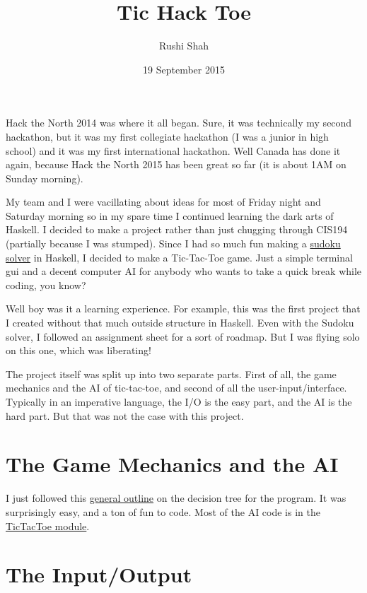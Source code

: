 \documentclass[12pt]{article}
\title{Tic Hack Toe}
\author{Rushi Shah}
\date{19 September 2015}
\begin{document}
  \maketitle

  Hack the North 2014 was where it all began. Sure, it was technically my
  second hackathon, but it was my first collegiate hackathon (I was a
  junior in high school) and it was my first international hackathon. Well
  Canada has done it again, because Hack the North 2015 has been great so
  far (it is about 1AM on Sunday morning).

  My team and I were vacillating about ideas for most of Friday night and
  Saturday morning so in my spare time I continued learning the dark arts
  of Haskell. I decided to make a project rather than just chugging
  through CIS194 (partially because I was stumped). Since I had so much
  fun making a \href{https://github.com/2016rshah/sudoku-solver}{sudoku
  solver} in Haskell, I decided to make a Tic-Tac-Toe game. Just a simple
  terminal gui and a decent computer AI for anybody who wants to take a
  quick break while coding, you know?

  Well boy was it a learning experience. For example, this was the first
  project that I created without that much outside structure in Haskell.
  Even with the Sudoku solver, I followed an assignment sheet for a sort
  of roadmap. But I was flying solo on this one, which was liberating!

  The project itself was split up into two separate parts. First of all,
  the game mechanics and the AI of tic-tac-toe, and second of all the
  user-input/interface. Typically in an imperative language, the I/O is
  the easy part, and the AI is the hard part. But that was not the case
  with this project.

  \section{The Game Mechanics and the
  AI}\label{the-game-mechanics-and-the-ai}

  I just followed this
  \href{http://programmers.stackexchange.com/questions/213559/algorithm-to-create-an-tictactoe-game-ai}{general
  outline} on the decision tree for the program. It was surprisingly easy,
  and a ton of fun to code. Most of the AI code is in the
  \href{https://github.com/2016rshah/Tic-Hack-Toe/blob/master/src/TicTacToe.hs}{TicTacToe
  module}.

  \section{The Input/Output}\label{the-inputoutput}
\end{document}
